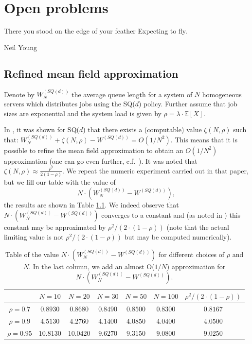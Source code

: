 \documentclass[12pt]{report}
\newcommand{\E}{\mathbb{E}}
\begin{document}
\chapter{Open problems} \label{chap:open}
\epigraph{There you stood on the edge of your feather\newline
	Expecting to fly.}{Neil Young}

\section{Refined mean field approximation} \label{sec:open_refined}
Denote by $W_{N}^{(SQ(d))}$ the average queue length for a system of $N$ homogeneous servers which distributes jobs using the SQ($d$) policy. Further assume that job sizes are exponential and the system load is given by $\rho = \lambda \cdot \E[X]$.

In \cite{gast_refined}, it was shown for SQ($d$) that there exists a (computable) value $\zeta(N, \rho)$ such that: $W_{N}^{(SQ(d))}+\zeta(N,\rho)-W^{(SQ(d))}=O(1/N^2)$. This means that it is possible to refine the mean field approximation to obtain an $O(1/N^2)$ approximation (one can go even further, c.f.~\cite{gast_refined}). It was noted that $\zeta(N,\rho)\approx \frac{\rho^2}{2(1-\rho)}$. We repeat the numeric experiment carried out in that paper, but we fill our table with the value of 
$$
N\cdot (W_{N}^{(SQ(d))}-W^{(SQ(d))}),
$$
the results are shown in Table \ref{table:refined1}. We indeed observe that $N\cdot (W_{N}^{(SQ(d))}-W^{(SQ(d))})$ converges to a constant and (as noted in \cite{gast_refined}) this constant may be approximated by $\rho^2 / (2 \cdot (1-\rho))$ (note that the actual limiting value is not $\rho^2 / (2 \cdot (1-\rho))$ but may be computed numerically).

\begin{table}[h!]
	\centering
	\begin{tabular}{||c c c c c c c||} 
		\hline
		& $N=10$ & $N=20$ & $N=30$ & $N=50$ & $N=100$ & $\rho^2/(2\cdot (1-\rho))$ \\
		\hline\hline
		$\rho = 0.7$ & $0.8930$ &  $0.8680$ &    $0.8490$ &    $0.8500$ &    $0.8300$ & $0.8167$\\
		$\rho = 0.9$  &  $4.5130$ &    $4.2760$ &    $4.1400$ &    $4.0850$ &    $4.0400$ & $4.0500$ \\
		$\rho = 0.95$ &  $10.8130$ &    $10.0420$ &    $9.6270$ &    $9.3150$ &    $9.0800$ & $9.0250$ \\ [1ex] 
		\hline
	\end{tabular}
	\caption{Table of the value $N\cdot (W_{N}^{(SQ(d))}-W^{(SQ(d))})$ for different choices of $\rho$ and $N$. In the last column, we add an almost O($1/N$) approximation for $N\cdot (W_{N}^{(SQ(d))}-W^{(SQ(d))})$.}
	\label{table:refined1}
\end{table}
\end{document}
